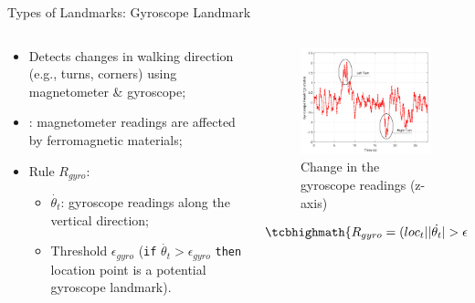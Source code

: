 \begin{frame}{Types of Landmarks: Gyroscope Landmark}
    \begin{columns}
        \begin{column}{.55\textwidth}
            \begin{itemize}
                \item Detects changes in walking direction (e.g., turns, corners) using magnetometer \& gyroscope;
                \item {}: magnetometer readings are affected by ferromagnetic materials;
                \item Rule \( R_{gyro} \):
                    \begin{itemize}
                        \item \( \dot{\theta_t} \): gyroscope readings along the vertical direction;
                        \item Threshold \( \epsilon_{gyro} \) (\texttt{if} \( \dot{\theta_t} > \epsilon_{gyro}\) \texttt{then} location point is a potential gyroscope landmark).
                    \end{itemize}
            \end{itemize}
        \end{column}
        \begin{column}{.45\textwidth}
            \begin{figure}[t]
                \vspace{0pt}
                \centering
                \includegraphics[width=\linewidth]{images/rgyro.jpg}
                \caption{Change in the gyroscope readings (z-axis)}
                \label{fig:rgyro}
            \end{figure}
            \begin{equation*}
                \tcbhighmath{
                    R_{gyro} = (loc_t |  \abs{\dot{\theta_t}} > \epsilon_{gyro})
                }
            \end{equation*}
        \end{column}
    \end{columns}
\end{frame}

